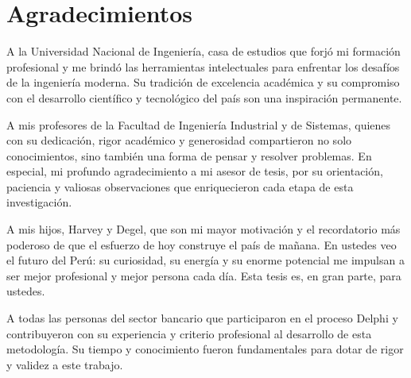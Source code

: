 \chapter*{Agradecimientos}

A la Universidad Nacional de Ingeniería, casa de estudios que forjó mi formación
profesional y me brindó las herramientas intelectuales para enfrentar los desafíos
de la ingeniería moderna. Su tradición de excelencia académica y su compromiso
con el desarrollo científico y tecnológico del país son una inspiración permanente.

A mis profesores de la Facultad de Ingeniería Industrial y de Sistemas, quienes con
su dedicación, rigor académico y generosidad compartieron no solo conocimientos,
sino también una forma de pensar y resolver problemas. En especial, mi profundo
agradecimiento a mi asesor de tesis, por su orientación, paciencia y valiosas
observaciones que enriquecieron cada etapa de esta investigación.

A mis hijos, Harvey y Degel, que son mi mayor motivación y el recordatorio más
poderoso de que el esfuerzo de hoy construye el país de mañana. En ustedes veo
el futuro del Perú: su curiosidad, su energía y su enorme potencial me impulsan a
ser mejor profesional y mejor persona cada día. Esta tesis es, en gran parte, para
ustedes.

A todas las personas del sector bancario que participaron en el proceso Delphi y
contribuyeron con su experiencia y criterio profesional al desarrollo de esta
metodología. Su tiempo y conocimiento fueron fundamentales para dotar de rigor y
validez a este trabajo.
